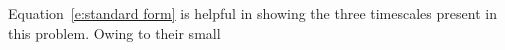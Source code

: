 Equation~\eqref{e:standard form} is helpful in showing
the three timescales present in this problem. Owing to their small
